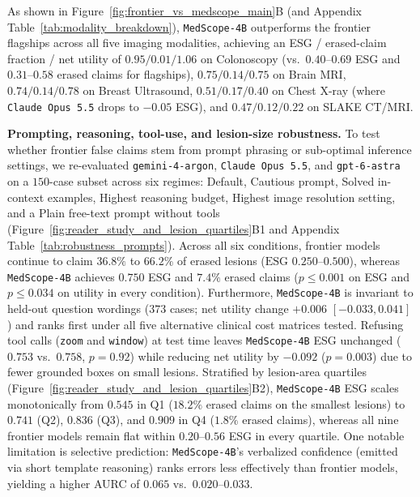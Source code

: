 \documentclass{article} %
\begin{document}
As shown in Figure~\ref{fig:frontier_vs_medscope_main}B (and Appendix Table~\ref{tab:modality_breakdown}), \texttt{MedScope-4B} outperforms the frontier flagships across all five imaging modalities, achieving an ESG / erased-claim fraction / net utility of $0.95 / 0.01 / 1.06$ on Colonoscopy (vs.\ $0.40\text{--}0.69$ ESG and $0.31\text{--}0.58$ erased claims for flagships), $0.75 / 0.14 / 0.75$ on Brain MRI, $0.74 / 0.14 / 0.78$ on Breast Ultrasound, $0.51 / 0.17 / 0.40$ on Chest X-ray (where \texttt{Claude Opus 5.5} drops to $-0.05$ ESG), and $0.47 / 0.12 / 0.22$ on SLAKE CT/MRI.

\textbf{Prompting, reasoning, tool-use, and lesion-size robustness.} To test whether frontier false claims stem from prompt phrasing or sub-optimal inference settings, we re-evaluated \texttt{gemini-4-argon}, \texttt{Claude Opus 5.5}, and \texttt{gpt-6-astra} on a $150$-case subset across six regimes: Default, Cautious prompt, Solved in-context examples, Highest reasoning budget, Highest image resolution setting, and a Plain free-text prompt without tools (Figure~\ref{fig:reader_study_and_lesion_quartiles}B1 and Appendix Table~\ref{tab:robustness_prompts}). Across all six conditions, frontier models continue to claim $36.8\%$ to $66.2\%$ of erased lesions ($\text{ESG } 0.250\text{--}0.500$), whereas \texttt{MedScope-4B} achieves $0.750$ ESG and $7.4\%$ erased claims ($p \le 0.001$ on ESG and $p \le 0.034$ on utility in every condition). Furthermore, \texttt{MedScope-4B} is invariant to held-out question wordings ($373$ cases; net utility change $+0.006$ $[-0.033, 0.041]$) and ranks first under all five alternative clinical cost matrices tested. Refusing tool calls (\texttt{zoom} and \texttt{window}) at test time leaves \texttt{MedScope-4B} ESG unchanged ($0.753$ vs.\ $0.758$, $p = 0.92$) while reducing net utility by $-0.092$ ($p = 0.003$) due to fewer grounded boxes on small lesions. Stratified by lesion-area quartiles (Figure~\ref{fig:reader_study_and_lesion_quartiles}B2), \texttt{MedScope-4B} ESG scales monotonically from $0.545$ in Q1 ($18.2\%$ erased claims on the smallest lesions) to $0.741$ (Q2), $0.836$ (Q3), and $0.909$ in Q4 ($1.8\%$ erased claims), whereas all nine frontier models remain flat within $0.20\text{--}0.56$ ESG in every quartile. One notable limitation is selective prediction: \texttt{MedScope-4B}'s verbalized confidence (emitted via short template reasoning) ranks errors less effectively than frontier models, yielding a higher AURC of $0.065$ vs.\ $0.020\text{--}0.033$.
\end{document}
